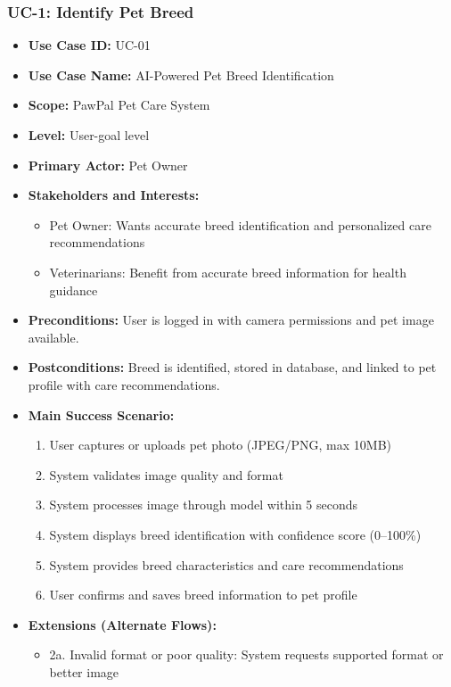 \subsubsection*{UC-1: Identify Pet Breed}
\begin{itemize}
    \item \textbf{Use Case ID:} UC-01
    \item \textbf{Use Case Name:} AI-Powered Pet Breed Identification
    \item \textbf{Scope:} PawPal Pet Care System
    \item \textbf{Level:} User-goal level
    \item \textbf{Primary Actor:} Pet Owner
    \item \textbf{Stakeholders and Interests:}
    \begin{itemize}
        \item Pet Owner: Wants accurate breed identification and personalized care recommendations
        \item Veterinarians: Benefit from accurate breed information for health guidance
    \end{itemize}
    \item \textbf{Preconditions:} User is logged in with camera permissions and pet image available.
    \item \textbf{Postconditions:} Breed is identified, stored in database, and linked to pet profile with care recommendations.
    \item \textbf{Main Success Scenario:}
    \begin{enumerate}
        \item User captures or uploads pet photo (JPEG/PNG, max 10MB)
        \item System validates image quality and format
        \item System processes image through model within 5 seconds
        \item System displays breed identification with confidence score (0--100\%)
        \item System provides breed characteristics and care recommendations
        \item User confirms and saves breed information to pet profile
    \end{enumerate}
    \item \textbf{Extensions (Alternate Flows):}
    \begin{itemize}
        \item 2a. Invalid format or poor quality: System requests supported format or better image

\end{itemize}
\end{itemize}
